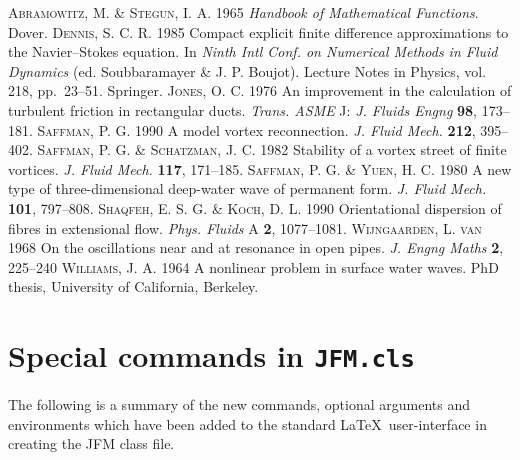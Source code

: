 \documentclass{jfm}
\begin{document}
\begin{thebibliography}{}
    \textsc{Abramowitz, M. \& Stegun, I. A.} 1965
    \emph{Handbook of Mathematical Functions}. Dover.
    \textsc{Dennis, S. C. R.} 1985
    Compact explicit finite difference approximations to the
    Navier--Stokes equation. In \emph{Ninth Intl Conf. on
    Numerical Methods in Fluid Dynamics} (ed. Soubbaramayer
    \& J. P. Boujot). Lecture Notes in Physics, vol. 218,
    pp.~23--51. Springer.
    \textsc{Jones, O. C.} 1976
    An improvement in the calculation of turbulent friction in
    rectangular ducts. \emph{Trans. ASME} J:
    \emph{J. Fluids Engng} \textbf{98}, 173--181.
    \textsc{Saffman, P. G.} 1990
    A model vortex reconnection. \emph{J. Fluid Mech.}
    \textbf{212}, 395--402.
    \textsc{Saffman, P. G. \& Schatzman, J. C.} 1982
    Stability of a vortex street of finite vortices.
    \emph{J. Fluid Mech.} \textbf{117}, 171--185.
    \textsc{Saffman, P. G. \& Yuen, H. C.} 1980
    A new type of three-dimensional deep-water wave of permanent
    form. \emph{J. Fluid Mech.} \textbf{101}, 797--808.
    \textsc{Shaqfeh, E. S. G. \& Koch, D. L.} 1990
    Orientational dispersion of fibres in extensional flow.
    \emph{Phys. Fluids} A \textbf{2}, 1077--1081.
    \textsc{Wijngaarden, L. van} 1968
    On the oscillations near and at resonance in open pipes.
    \emph{J. Engng Maths} \textbf{2}, 225--240
    \textsc{Williams, J. A.} 1964
    A nonlinear problem in surface water waves. PhD thesis,
    University of California, Berkeley.
\end{thebibliography}

\ifCUPmtlplainloaded \newpage\fi

\appendix
\section{Special commands in {\mdseries\texttt{JFM.cls}}}
\ifCUPmtlplainloaded\else {}\fi

The following is a summary of the new commands, optional
arguments and environments which have been added to the
standard \LaTeX\ user-interface in creating the JFM class file.
\vspace{6pt}
\end{document}
